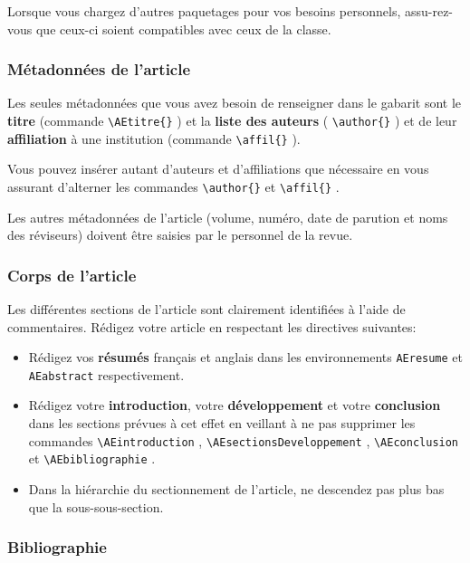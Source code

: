 \documentclass[french]{article}
\newcommand{\cmd}[1]{%
	\texttt{\textbackslash#1\{\}}
}
\newcommand{\dec}[1]{%
	\texttt{\textbackslash#1}
}
\begin{document}
				Lorsque vous chargez d'autres paquetages pour vos besoins personnels, assu-rez-vous que ceux-ci soient
				compatibles avec ceux de la classe.
				
			\subsubsection{Métadonnées de l'article}
			
				Les seules métadonnées que vous avez besoin de renseigner dans le gabarit sont le \textbf{titre} (commande
				\cmd{AEtitre}) et la \textbf{liste des auteurs} (\cmd{author}) et de leur \textbf{affiliation} à une institution (commande
				\cmd{affil}).
				
				Vous pouvez insérer autant d'auteurs et d'affiliations que nécessaire en vous assurant d'alterner les
				commandes \cmd{author} et \cmd{affil}.
				
				Les autres métadonnées de l'article (volume, numéro, date de parution et noms des réviseurs) doivent
				être saisies par le personnel de la revue.
				
			\subsubsection{Corps de l'article}
			
				Les différentes sections de l'article sont clairement identifiées à l'aide de commentaires. Rédigez
				votre article en respectant les directives suivantes:
				
				\begin{itemize}
					\item Rédigez vos \textbf{résumés}  français et anglais dans les environnements \texttt{AEresume} et
						\texttt{AEabstract} respectivement.
					\item Rédigez votre \textbf{introduction}, votre \textbf{développement} et votre \textbf{conclusion} dans les sections prévues
						à cet effet en veillant à ne pas supprimer les commandes \dec{AEintroduction},
						\dec{AEsectionsDeveloppement}, \dec{AEconclusion} et \dec{AEbibliographie}.
					\item Dans la hiérarchie du sectionnement de l'article, ne descendez pas plus bas que la sous-sous-section.
				\end{itemize}
			
			\subsubsection{Bibliographie}
			
\end{document}
